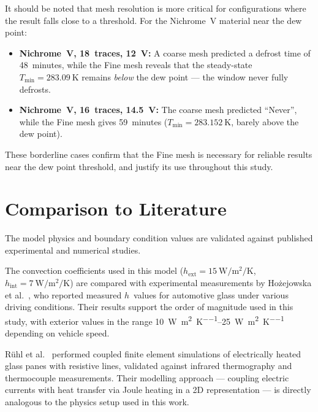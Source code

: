 It should be noted that mesh resolution is more critical for configurations where the result falls close to a threshold. For the Nichrome~V material near the dew point:
\begin{itemize}
    \item \textbf{Nichrome~V, 18~traces, \SI{12}{\volt}:} A coarse mesh predicted a defrost time of 48~minutes, while the Fine mesh reveals that the steady-state $T_\text{min} = \SI{283.09}{\kelvin}$ remains \emph{below} the dew point --- the window never fully defrosts.
    \item \textbf{Nichrome~V, 16~traces, \SI{14.5}{\volt}:} The coarse mesh predicted ``Never'', while the Fine mesh gives 59~minutes ($T_\text{min} = \SI{283.152}{\kelvin}$, barely above the dew point).
\end{itemize}

These borderline cases confirm that the Fine mesh is necessary for reliable results near the dew point threshold, and justify its use throughout this study.


\section{Comparison to Literature}
\label{sec:literature-validation}

The model physics and boundary condition values are validated against published experimental and numerical studies.

The convection coefficients used in this model ($h_\text{ext} = \SI{15}{\watt\per\metre\squared\per\kelvin}$, $h_\text{int} = \SI{7}{\watt\per\metre\squared\per\kelvin}$) are compared with experimental measurements by Ho\.{z}ejowska et al.\ \cite{hozejowska2019}, who reported measured $h$~values for automotive glass under various driving conditions. Their results support the order of magnitude used in this study, with exterior values in the range \SIrange{10}{25}{\watt\per\metre\squared\per\kelvin} depending on vehicle speed.

R\"uhl et al.\ \cite{ruhl2016} performed coupled finite element simulations of electrically heated glass panes with resistive lines, validated against infrared thermography and thermocouple measurements. Their modelling approach --- coupling electric currents with heat transfer via Joule heating in a 2D representation --- is directly analogous to the physics setup used in this work.

